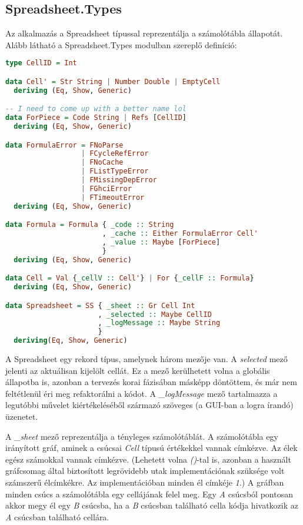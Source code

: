 \subsection{Spreadsheet.Types}

Az alkalmazás a Spreadsheet típussal reprezentálja a számolótábla állapotát. Alább látható a Spreadsheet.Types modulban szereplő definíció:

\begin{lstlisting}[language={Haskell}]
type CellID = Int

data Cell' = Str String | Number Double | EmptyCell
  deriving (Eq, Show, Generic)

-- I need to come up with a better name lol
data ForPiece = Code String | Refs [CellID]
  deriving (Eq, Show, Generic)

data FormulaError = FNoParse
                  | FCycleRefError
                  | FNoCache
                  | FListTypeError
                  | FMissingDepError
                  | FGhciError
                  | FTimeoutError
  deriving (Eq, Show, Generic)

data Formula = Formula { _code :: String
                       , _cache :: Either FormulaError Cell'
                       , _value :: Maybe [ForPiece]
                       }
  deriving (Eq, Show, Generic)

data Cell = Val {_cellV :: Cell'} | For {_cellF :: Formula}
  deriving (Eq, Show, Generic)

data Spreadsheet = SS { _sheet :: Gr Cell Int
                      , _selected :: Maybe CellID
                      , _logMessage :: Maybe String
                      }
  deriving(Eq, Show, Generic)
\end{lstlisting}

A Spreadsheet egy rekord típus, amelynek három mezője van. A \textit{selected} mező jelenti az aktuálisan kijelölt cellát. Ez a mező kerülhetett volna a globális állapotba is, azonban a tervezés korai fázisában másképp döntöttem, és már nem feltétlenül éri meg refaktorálni a kódot. A \textit{\_logMessage} mező tartalmazza a legutóbbi művelet kiértékeléséből származó szöveges (a GUI-ban a logra írandó) üzenetet.

A \textit{\_sheet} mező reprezentálja a tényleges számolótáblát. A számolótábla egy irányított gráf, aminek a csúcsai \textit{Cell} típusú értékekkel vannak címkézve. Az élek egész számokkal vannak címkézve. (Lehetett volna \textit{()}-tal is, azonban a használt gráfcsomag által biztosított legrövidebb utak implementációnak szüksége volt számszerű élcímkékre. Az implementációban minden él címkéje \textit{1}.) A gráfban minden csúcs a számolótábla egy cellájának felel meg. Egy \textit{A} csúcsból pontosan akkor megy él egy \textit{B} csúcsba, ha a \textit{B} csúcsban található cella kódja hivatkozik az \textit{A} csúcsban található cellára. 

